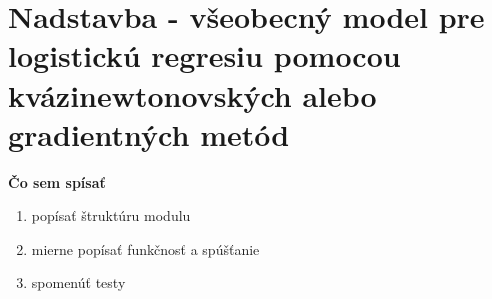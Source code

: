 \documentclass[report.tex]{subfiles}
\begin{document}
	
\section{Nadstavba - všeobecný model pre logistickú regresiu pomocou kvázinewtonovských alebo gradientných metód}\label{sec:H}

\textbf{Čo sem spísať}
\begin{enumerate}
	\item popísať štruktúru modulu
	\item mierne popísať funkčnosť a spúšťanie
	\item spomenúť testy
\end{enumerate}
	
\end{document}
